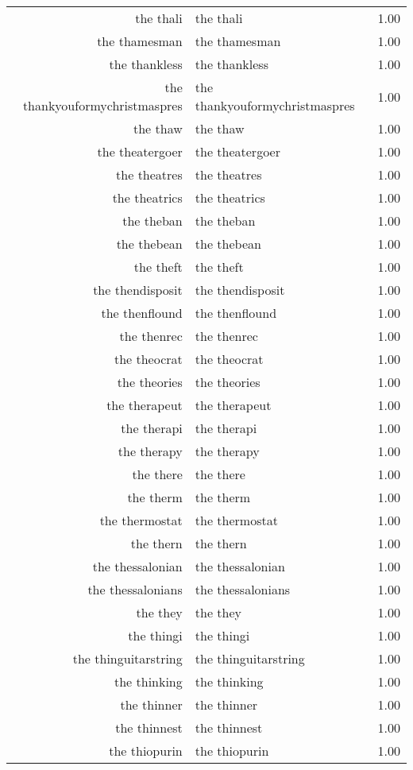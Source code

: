 \begin{table}[ht]
\begin{tabular}{rlr}
  the thali & the thali & 1.00 \\ 
  the thamesman & the thamesman & 1.00 \\ 
  the thankless & the thankless & 1.00 \\ 
  the thankyouformychristmaspres & the thankyouformychristmaspres & 1.00 \\ 
  the thaw & the thaw & 1.00 \\ 
  the theatergoer & the theatergoer & 1.00 \\ 
  the theatres & the theatres & 1.00 \\ 
  the theatrics & the theatrics & 1.00 \\ 
  the theban & the theban & 1.00 \\ 
  the thebean & the thebean & 1.00 \\ 
  the theft & the theft & 1.00 \\ 
  the thendisposit & the thendisposit & 1.00 \\ 
  the thenflound & the thenflound & 1.00 \\ 
  the thenrec & the thenrec & 1.00 \\ 
  the theocrat & the theocrat & 1.00 \\ 
  the theories & the theories & 1.00 \\ 
  the therapeut & the therapeut & 1.00 \\ 
  the therapi & the therapi & 1.00 \\ 
  the therapy & the therapy & 1.00 \\ 
  the there & the there & 1.00 \\ 
  the therm & the therm & 1.00 \\ 
  the thermostat & the thermostat & 1.00 \\ 
  the thern & the thern & 1.00 \\ 
  the thessalonian & the thessalonian & 1.00 \\ 
  the thessalonians & the thessalonians & 1.00 \\ 
  the they & the they & 1.00 \\ 
  the thingi & the thingi & 1.00 \\ 
  the thinguitarstring & the thinguitarstring & 1.00 \\ 
  the thinking & the thinking & 1.00 \\ 
  the thinner & the thinner & 1.00 \\ 
  the thinnest & the thinnest & 1.00 \\ 
  the thiopurin & the thiopurin & 1.00 \\ 

\end{tabular}
\end{table}
